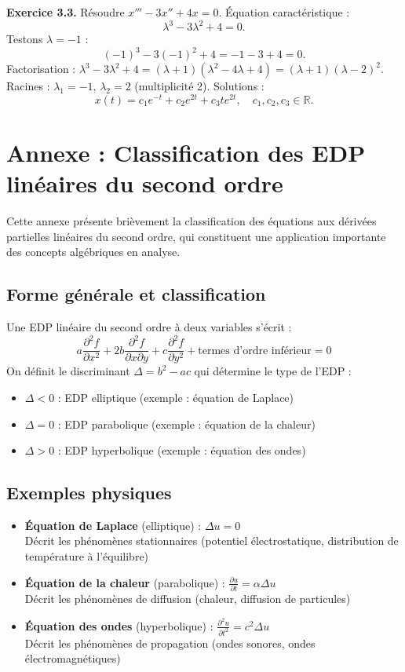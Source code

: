 \textbf{Exercice 3.3.} Résoudre \( x''' - 3x'' + 4x = 0 \).  
Équation caractéristique :
\[
\lambda^3 - 3\lambda^2 + 4 = 0.
\]
Testons \( \lambda = -1 \) :
\[
(-1)^3 - 3(-1)^2 + 4 = -1 - 3 + 4 = 0.
\]
Factorisation : \( \lambda^3 - 3\lambda^2 + 4 = (\lambda + 1)(\lambda^2 - 4\lambda + 4) = (\lambda + 1)(\lambda - 2)^2 \). Racines : \( \lambda_1 = -1 \), \( \lambda_2 = 2 \) (multiplicité 2). Solutions :
\[
x(t) = c_1 e^{-t} + c_2 e^{2t} + c_3 t e^{2t}, \quad c_1, c_2, c_3 \in \mathbb{R}.
\]

\section*{Annexe : Classification des EDP linéaires du second ordre}

Cette annexe présente brièvement la classification des équations aux dérivées partielles linéaires du second ordre, qui constituent une application importante des concepts algébriques en analyse.

\subsection{Forme générale et classification}

Une EDP linéaire du second ordre à deux variables s'écrit :
\[
a \frac{\partial^2 f}{\partial x^2} + 2b \frac{\partial^2 f}{\partial x \partial y} + c \frac{\partial^2 f}{\partial y^2} + \text{termes d'ordre inférieur} = 0
\]
On définit le discriminant $\Delta = b^2 - ac$ qui détermine le type de l'EDP :
\begin{itemize}
	\item $\Delta < 0$ : EDP elliptique (exemple : équation de Laplace)
	\item $\Delta = 0$ : EDP parabolique (exemple : équation de la chaleur)
	\item $\Delta > 0$ : EDP hyperbolique (exemple : équation des ondes)
\end{itemize}

\subsection{Exemples physiques}

\begin{itemize}
	\item \textbf{Équation de Laplace} (elliptique) : $\Delta u = 0$ \\
	Décrit les phénomènes stationnaires (potentiel électrostatique, distribution de température à l'équilibre)
	
	\item \textbf{Équation de la chaleur} (parabolique) : $\frac{\partial u}{\partial t} = \alpha \Delta u$ \\
	Décrit les phénomènes de diffusion (chaleur, diffusion de particules)
	
	\item \textbf{Équation des ondes} (hyperbolique) : $\frac{\partial^2 u}{\partial t^2} = c^2 \Delta u$ \\
	Décrit les phénomènes de propagation (ondes sonores, ondes électromagnétiques)
\end{itemize}
